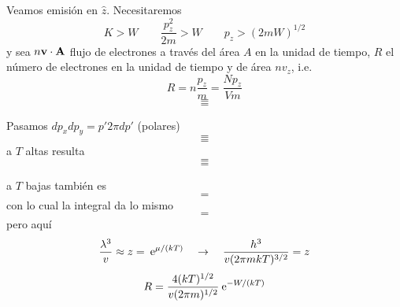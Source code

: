 \documentclass[10pt,oneside]{CBFT_book}
\begin{document}
Veamos emisión en $\hat{z}$. Necesitaremos 
\[
	K > W \qquad \frac{p_z^2}{2m} > W \qquad p_z > (2mW)^{1/2}
\]
y sea $ n \vb{v} \cdot \vb{A} $ flujo de electrones a través del área $A$ en la unidad de tiempo,
$R$ el número de electrones en la unidad de tiempo y de área $nv_z$, i.e.
\[
	R = n \frac{p_z}{m} = \frac{Np_z}{Vm}
\]
\[
	=
\]
\[
	=
\]

Pasamos $dp_x dp_y = p' 2\pi dp' $ (polares)
\[
	=
\]
\[
	=
\]
a $T$ altas resulta 
\[
	=
\]
\[
	=
\]

a $T$ bajas también es 
\[
	=
\]
con lo cual la integral da lo mismo
\[
	=
\]
pero aquí 
\[
	\frac{\lambda^3}{v} \approx z = \:\mathrm{e}^{\mu/(kT)} \quad \rightarrow \quad 
	\frac{h^3}{v(2\pi m kT)^{3/2}} = z
\]
\[
	R = \frac{ 4(kT)^{1/2} }{v(2 \pi m)^{1/2}} \:\mathrm{e}^{-W/(kT)}
\]

\end{document}
